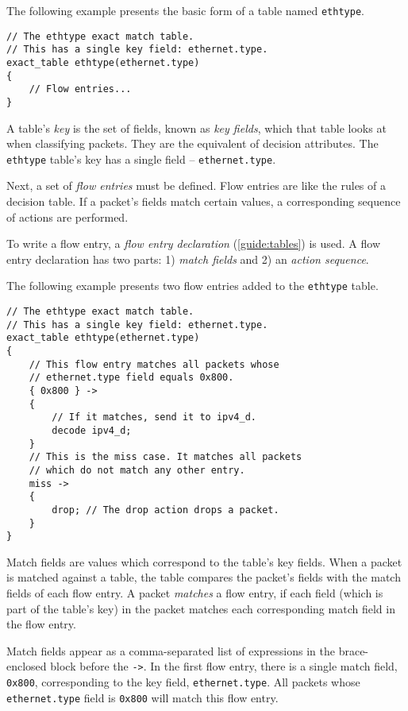 The following example presents the basic form of a table named
\texttt{ethtype}. 

\begin{codepage}
\begin{lstlisting}
// The ethtype exact match table.
// This has a single key field: ethernet.type.
exact_table ethtype(ethernet.type)
{
	// Flow entries...
}
\end{lstlisting}
\end{codepage}

A table's \textit{key} is the set of fields, known as
\textit{key fields}, which that table looks at when classifying packets. They are the
equivalent of decision attributes. The \texttt{ethtype} table's key has a single
field -- \texttt{ethernet.type}.

Next, a set of \textit{flow entries} must be defined. Flow entries are like the
rules of a decision table. If a packet's fields match certain values, a
corresponding sequence of actions are performed.

To write a flow entry, a \textit{flow entry declaration}
(\ref{guide:tables}) is used. A flow entry declaration has two parts: 1) \textit{match
fields} and 2) an \textit{action sequence}. 

The following example presents two flow entries added to the \texttt{ethtype} table.

\begin{codepage}
\begin{lstlisting}
// The ethtype exact match table.
// This has a single key field: ethernet.type.
exact_table ethtype(ethernet.type)
{
	// This flow entry matches all packets whose
	// ethernet.type field equals 0x800.
	{ 0x800 } ->
	{
		// If it matches, send it to ipv4_d.
		decode ipv4_d;
	}
	// This is the miss case. It matches all packets
	// which do not match any other entry.
	miss ->
	{
		drop; // The drop action drops a packet.
	}
}
\end{lstlisting}
\end{codepage}

Match fields are values which
correspond to the table's key fields. When a packet is matched against a table,
the table compares the packet's fields with the match fields of each flow entry.
A packet \textit{matches} a flow entry, if each field (which is part of the
table's key) in the packet matches each corresponding match field in the flow entry. 

Match
fields appear as a comma-separated list of expressions in the brace-enclosed
block before the \texttt{->}. In the first flow entry, there is a single match field,
\texttt{0x800}, corresponding to the key field, \texttt{ethernet.type}.
All packets whose \texttt{ethernet.type} field is \texttt{0x800} will match
this flow entry. 

